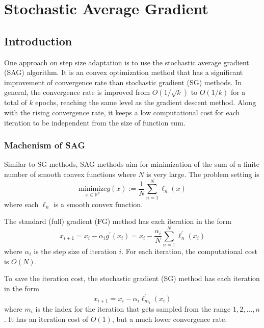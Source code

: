 \chapter{Stochastic Average Gradient}
\label{ch: SAG}

\section{Introduction}
One approach on step size adaptation is to use the stochastic average gradient (SAG)\cite{schmidtMinimizingFiniteSums2016} algorithm. It is an convex optimization method that has a significant improvement of convergence rate than stochastic gradient (SG) methods. In general, the convergence rate is improved from $O(1/\sqrt{k})$ to $O(1/k)$ for a total of $k$ epochs, reaching the same level as the gradient descent method. Along with the rising convergence rate, it keeps a low computational cost for each iteration to be independent from the size of function sum.

\subsection{Machenism of SAG}
Similar to SG methods, SAG methods aim for minimization of the sum of a finite number of smooth convex functions where $N$ is very large. The problem setting is
\begin{equation}
\underset{x \in \mathbb{R}^p}{\text{minimize}} g(x) := \frac{1}{N}\sum^N_{n=1} \ell_n(x)
\end{equation}
where each $\ell_n$ is a smooth convex function.

The standard (full) gradient (FG) method has each iteration in the form
\begin{equation}
x_{i+1} = x_i - \alpha_i g^{\prime} (x_i) = x_i - \frac{\alpha_i}{N}\sum^N_{n=1} \ell_n^{\prime}(x_i)
\end{equation}
where $\alpha_i$ is the step size of iteration $i$. For each iteration, the computational cost is $O(N)$.

To save the iteration cost, the stochastic gradient (SG) method has each iteration in the form
\begin{equation}
x_{i+1} = x_i - \alpha_i \ell_{m_i}^{\prime} (x_i)
\end{equation}
where $m_i$ is the index for the iteration that gets sampled from the range {$1, 2,...,n$}. It has an iteration cost of $O(1)$, but a much lower convergence rate.

